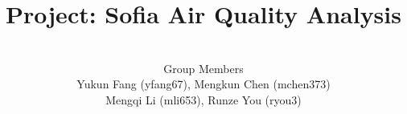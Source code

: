 \documentclass[12pt]{beamer}
\begin{document}
\begin{CJK*}{GBK}{kai}

\title{Project: Sofia Air Quality Analysis}

\author{ \\[1em] Group Members \\[1em]
Yukun Fang (yfang67), Mengkun Chen (mchen373)\\ Mengqi Li (mli653), Runze You (ryou3)}

\date{}

\begin{frame}
  \titlepage
\end{frame}






\end{CJK*}
\end{document}
